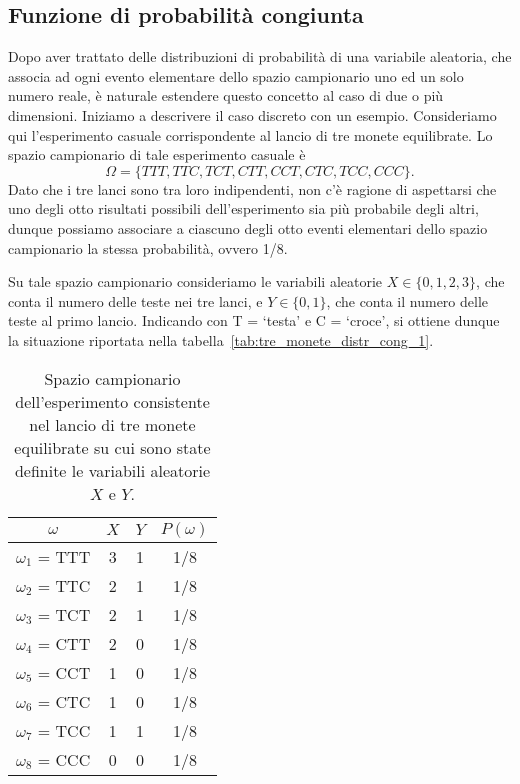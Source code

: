 \subsection{Funzione di probabilità congiunta}

Dopo aver trattato delle distribuzioni di probabilità di una variabile aleatoria, che associa ad ogni evento elementare dello spazio campionario uno ed un solo numero reale, è naturale estendere questo concetto al caso di due o più dimensioni. 
Iniziamo a descrivere il caso discreto con un esempio. 
Consideriamo qui l'esperimento casuale corrispondente al lancio di tre monete equilibrate. 
Lo spazio campionario di tale esperimento casuale è
\[
\Omega = \{TTT, TTC, TCT, CTT, CCT, CTC, TCC, CCC\}.
\]
Dato che i tre lanci sono tra loro indipendenti, non c'è ragione di aspettarsi che uno degli otto risultati possibili dell'esperimento sia più probabile degli altri, dunque possiamo associare a ciascuno degli otto eventi elementari dello spazio campionario la stessa probabilità, ovvero 1/8.

Su tale spazio campionario consideriamo le variabili aleatorie $X \in \{0, 1, 2, 3\}$, che conta il numero delle teste nei tre lanci, e $Y \in \{0, 1\}$, che conta il numero delle teste al primo lancio. 
Indicando con T = `testa' e C = `croce', si ottiene dunque la situazione riportata nella tabella~\ref{tab:tre_monete_distr_cong_1}.
\begin{table}[h!]
\caption{Spazio campionario dell'esperimento consistente nel lancio di tre monete equilibrate su cui sono state definite le variabili aleatorie $X$ e $Y$.}
\label{tab:tre_monete_distr_cong_1}
\begin{center}
\begin{tabular}{cccc}
\toprule
$\omega$ & $X$ & $Y$ & $P(\omega)$ \\
\midrule
$\omega_1$ = TTT & 3 & 1 & 1/8 \\
$\omega_2$ = TTC & 2 & 1 & 1/8 \\
$\omega_3$ = TCT & 2 & 1 & 1/8 \\
$\omega_4$ = CTT & 2 & 0 & 1/8 \\
$\omega_5$ = CCT & 1 & 0 & 1/8 \\
$\omega_6$ = CTC & 1 & 0 & 1/8 \\
$\omega_7$ = TCC & 1 & 1 & 1/8 \\
$\omega_8$ = CCC & 0 & 0 & 1/8\\
\bottomrule
\end{tabular}
\end{center}
\label{default}
\end{table}%

